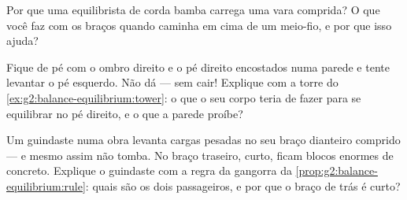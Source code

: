 \begin{exercise}[$\star$]\label{exo:g2:balance-equilibrium:8}
Por que uma equilibrista de corda bamba carrega uma vara comprida? O
que você faz com os braços quando caminha em cima de um meio-fio, e
por que isso ajuda?
\end{exercise}

\begin{exercise}[$\star$]\label{exo:g2:balance-equilibrium:9}
Fique de pé com o ombro direito e o pé direito encostados numa
parede e tente levantar o pé esquerdo. Não dá --- sem cair! Explique
com a torre do \cref{ex:g2:balance-equilibrium:tower}: o que o seu
corpo teria de fazer para se equilibrar no pé direito, e o que a
parede proíbe?
\end{exercise}

\begin{exercise}[$\star\star$]\label{exo:g2:balance-equilibrium:10}
Um guindaste numa obra levanta cargas pesadas no seu braço dianteiro
comprido --- e mesmo assim não tomba. No braço traseiro, curto, ficam
blocos enormes de concreto. Explique o guindaste com a regra da
gangorra da \cref{prop:g2:balance-equilibrium:rule}: quais são os
dois passageiros, e por que o braço de trás é curto?
\end{exercise}
